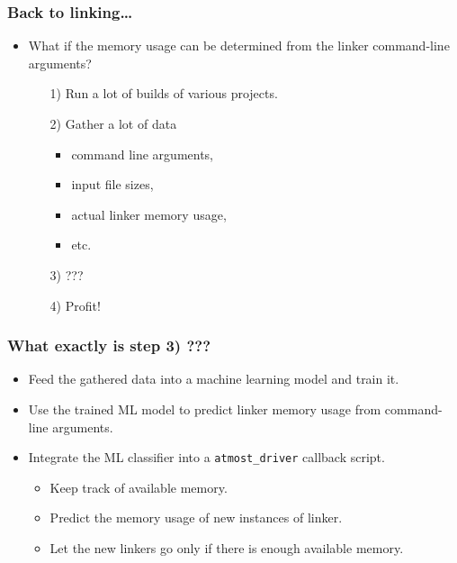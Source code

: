 \documentclass[compress,table,xcolor=table]{beamer}
\newcommand{\shelltext}[1]{\texttt{\colorbox{light-gray}{#1}}}
\begin{document}
\begin{frame}
  \frametitle{Back to linking\ldots}
  \begin{itemize}
  \Large
  \item What if the memory usage can be determined from the linker command-line
    arguments?
    \begin{itemize}
    \large
    \item[1)] Run a lot of builds of various projects.
    \item[2)] Gather {\Large a lot} of data
      \begin{itemize}
        \item command line arguments,
        \item input file sizes,
        \item actual linker memory usage,
        \item etc.
      \end{itemize}
    \item[3)] {\Large ???}
    \item[4)] {\LARGE Profit!}
    \end{itemize}
  \end{itemize}
\end{frame}
\begin{frame}
  \frametitle{What exactly is step 3) ???}
  \begin{itemize}
  \Large
  \item Feed the gathered data into a machine learning model and train it.
  \item Use the trained ML model to {\LARGE predict} linker {\LARGE memory usage}
    from command-line arguments.
  \item Integrate the ML classifier into a \shelltext{atmost\_driver} callback
    script.
    \begin{itemize}
      \large
      \item Keep track of available memory.
      \item Predict the memory usage of new instances of linker.
      \item Let the new linkers go only if there is enough available memory.
    \end{itemize}
  \end{itemize}
\end{frame}
\end{document}

